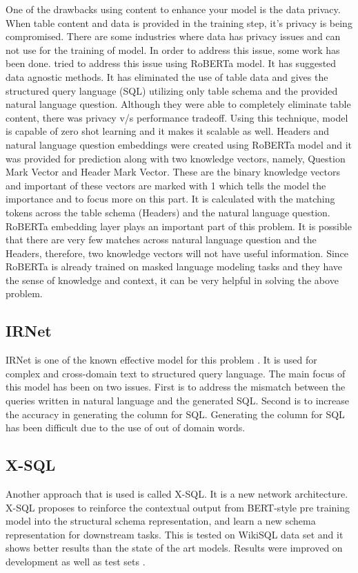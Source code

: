 \documentclass[12pt]{article}
\begin{document}
One of the drawbacks using content to enhance your model is the data privacy. When table content and data is provided in the training step, it's privacy is being compromised. There are some industries where data has privacy issues and can not use for the training of model. In order to address this issue, some work has been done. \cite{pal2020data} tried to address this issue using RoBERTa model. It has suggested data agnostic methods. It has eliminated the use of table data and gives the structured query language (SQL) utilizing only table schema and the provided natural language question. Although they were able to completely eliminate table content, there was privacy v/s performance tradeoff. Using this technique, model is capable of zero shot learning and it makes it scalable as well. Headers and natural language question embeddings were created using RoBERTa model and it was provided for prediction along with two knowledge vectors, namely, Question Mark Vector and Header Mark Vector. These are the binary knowledge vectors and important of these vectors are marked with 1 which tells the model the importance and to focus more on this part. It is calculated with the matching tokens across the table schema (Headers) and the natural language question. RoBERTa embedding layer plays an important part of this problem. It is possible that there are very few matches across natural language question and the Headers, therefore, two knowledge vectors will not have useful information. Since RoBERTa is already trained on masked language modeling tasks and they have the sense of knowledge and context, it can be very helpful in solving the above problem. \\
\subsection{IRNet}
IRNet is one of the known effective model for this problem \cite{guo2019towards}. It is used for complex and cross-domain text to structured query language. The main focus of this model has been on two issues. First is to address the mismatch between the queries written in natural language and the generated SQL. Second is to increase the accuracy in generating the column for SQL. Generating the column for SQL has been difficult due to the use of out of domain words. 
\subsection{X-SQL}
Another approach that is used is called X-SQL. It is a new network architecture. X-SQL proposes to reinforce the contextual output from BERT-style pre training model into the structural schema representation, and learn a new schema representation for downstream tasks. This is tested on WikiSQL data set and it shows better results than the state of the art models. Results were improved on development as well as test sets \cite{bogin2019global}.
\end{document}
